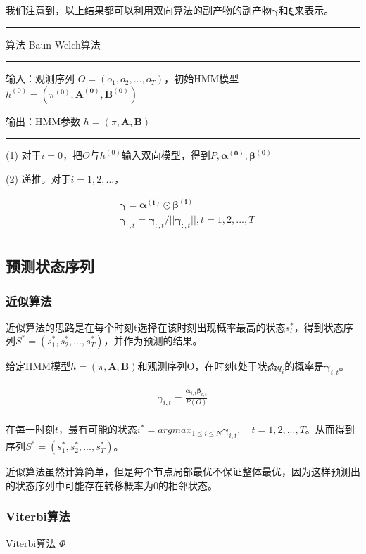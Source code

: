 \documentclass[]{article}
\begin{document}
  我们注意到，以上结果都可以利用双向算法的副产物的副产物$\boldsymbol{\gamma}$和$\boldsymbol{\xi}$来表示。
  
  \clearpage
  
  \rule[0pt]{12cm}{0.1em}
  
  算法 \quad Baun-Welch算法
  
  \rule[5pt]{12cm}{0.05em}
  
  输入：观测序列 $O=(o_1, o_2,..., o_T)$，初始HMM模型$h^{(0)}=(\pi^{(0)}, \boldsymbol{A^{(0)}}, \boldsymbol{B^{(0)}})$
    
  输出：HMM参数 $h=(\pi, \boldsymbol{A}, \boldsymbol{B})$
  
  \rule[10pt]{12cm}{0.05em}
  
  (1) 对于$i=0$，把$O$与$h^{(0)}$输入双向模型，得到$P, \boldsymbol{\alpha^{(0)}}, \boldsymbol{\beta^{(0)}}$  
  
  (2) 递推。对于$i=1,2,...$，
  
  \begin{equation}
  	\begin{aligned}
  		&\boldsymbol{\gamma}=\boldsymbol{\alpha^{(i)}}\odot \boldsymbol{\beta^{(i)}}\\
  		&\boldsymbol{\gamma}_{:,t}=\boldsymbol{\gamma}_{:,t} / ||\boldsymbol{\gamma}_{:,t}||,t=1,2,...,T \\
  	\end{aligned}  	
  \end{equation}
  

\subsection{预测状态序列}
  
  \subsubsection{近似算法}
    近似算法的思路是在每个时刻t选择在该时刻出现概率最高的状态$s_{t}^{*}$，得到状态序列$S^{*}=(s_{1}^{*},s_{2}^{*},...,s_{T}^{*})$，并作为预测的结果。

    给定HMM模型$h=(\pi, \boldsymbol{A}, \boldsymbol{B})$和观测序列O，在时刻t处于状态$q_i$的概率是$\boldsymbol{\gamma}_{i,t}$。
    
    \begin{equation}
    	\begin{aligned}
    		\gamma_{i,t}=\frac{\boldsymbol{\alpha}_{i,t}\boldsymbol{\beta}_{i,t}}{P(O)}\\
    	\end{aligned}
    \end{equation}

    在每一时刻$t$，最有可能的状态$i^{*}=argmax_{1\le i \le N}\boldsymbol{\gamma}_{i,t},\quad t=1,2,...,T$。从而得到序列$S^{*}=(s_{1}^{*},s_{2}^{*},...,s_{T}^{*})$。
  
    近似算法虽然计算简单，但是每个节点局部最优不保证整体最优，因为这样预测出的状态序列中可能存在转移概率为0的相邻状态。
    
  \subsubsection{Viterbi算法} 
    Viterbi算法
    $\Phi$
    
\end{document}
